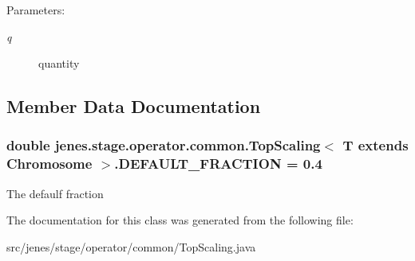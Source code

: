 \begin{Desc}
\item[Parameters:]
\begin{description}
\item[{\em q}]quantity \end{description}
\end{Desc}


\subsection{Member Data Documentation}
\hypertarget{classjenes_1_1stage_1_1operator_1_1common_1_1_top_scaling_3_01_t_01extends_01_chromosome_01_4_f21f9346a23ebaab4d7a5bd4367edafe}{
\subsubsection[DEFAULT\_\-FRACTION]{\setlength{\rightskip}{0pt plus 5cm}double jenes.stage.operator.common.TopScaling$<$ T extends Chromosome $>$.{\bf DEFAULT\_\-FRACTION} = 0.4}}
\label{classjenes_1_1stage_1_1operator_1_1common_1_1_top_scaling_3_01_t_01extends_01_chromosome_01_4_f21f9346a23ebaab4d7a5bd4367edafe}


The defaulf fraction 

The documentation for this class was generated from the following file:\begin{CompactItemize}
\item 
src/jenes/stage/operator/common/TopScaling.java\end{CompactItemize}
